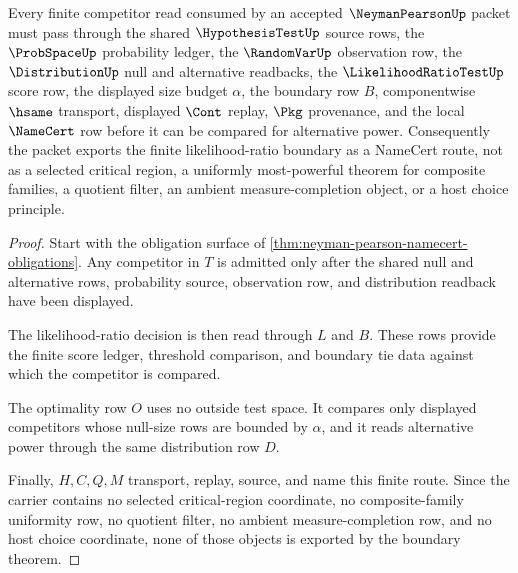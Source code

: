 \begin{theorem}
\label{thm:neyman-pearson-likelihood-ratio-boundary}
Every finite competitor read consumed by an accepted $\NeymanPearsonUp$ packet must pass through the shared $\HypothesisTestUp$ source rows, the $\ProbSpaceUp$ probability ledger, the $\RandomVarUp$ observation row, the $\DistributionUp$ null and alternative readbacks, the $\LikelihoodRatioTestUp$ score row, the displayed size budget $\alpha$, the boundary row $B$, componentwise $\hsame$ transport, displayed $\Cont$ replay, $\Pkg$ provenance, and the local $\NameCert$ row before it can be compared for alternative power. Consequently the packet exports the finite likelihood-ratio boundary as a NameCert route, not as a selected critical region, a uniformly most-powerful theorem for composite families, a quotient filter, an ambient measure-completion object, or a host choice principle.
\end{theorem}
\begin{proof}
Start with the obligation surface of \autoref{thm:neyman-pearson-namecert-obligations}. Any competitor in $T$ is admitted only after the shared null and alternative rows, probability source, observation row, and distribution readback have been displayed.

The likelihood-ratio decision is then read through $L$ and $B$. These rows provide the finite score ledger, threshold comparison, and boundary tie data against which the competitor is compared.

The optimality row $O$ uses no outside test space. It compares only displayed competitors whose null-size rows are bounded by $\alpha$, and it reads alternative power through the same distribution row $D$.

Finally, $H,C,Q,M$ transport, replay, source, and name this finite route. Since the carrier contains no selected critical-region coordinate, no composite-family uniformity row, no quotient filter, no ambient measure-completion row, and no host choice coordinate, none of those objects is exported by the boundary theorem.
\end{proof}


